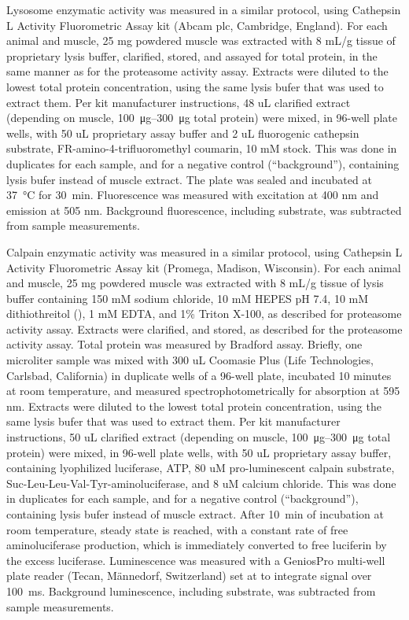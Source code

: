 \documentclass[12pt,english]{report}\usepackage[]{graphicx}\usepackage[]{color}
\begin{document}
Lysosome enzymatic activity was measured in a similar protocol, using
Cathepsin L Activity Fluorometric Assay kit (Abcam plc, Cambridge,
England). For each animal and muscle, 25 mg powdered muscle was extracted
with 8 mL/g tissue of proprietary lysis buffer, clarified, stored,
and assayed for total protein, in the same manner as for the proteasome
activity assay. Extracts were diluted to the lowest total protein
concentration, using the same lysis bufer that was used to extract
them. Per kit manufacturer instructions, 48 uL clarified extract (depending
on muscle, \SIrange{100}{300}{\micro\gram} total protein) were mixed,
in 96-well plate wells, with 50 uL proprietary assay buffer and 2
uL fluorogenic cathepsin substrate, FR-amino-4-trifluoromethyl coumarin,
10 mM stock. This was done in duplicates for each sample, and for
a negative control (``background''), containing lysis bufer instead
of muscle extract. The plate was sealed and incubated at \SI{37}{\celsius}
for \SI{30}{\minute}. Fluorescence was measured with excitation at
400 nm and emission at 505 nm. Background fluorescence, including
substrate, was subtracted from sample measurements.

Calpain enzymatic activity was measured in a similar protocol, using
Cathepsin L Activity Fluorometric Assay kit (Promega, Madison, Wisconsin).
For each animal and muscle, 25 mg powdered muscle was extracted with
8 mL/g tissue of lysis buffer containing 150 mM sodium chloride, 10
mM HEPES pH 7.4, 10 mM dithiothreitol (),
1 mM EDTA, and 1\% Triton X-100, as described for proteasome activity
assay. Extracts were clarified, and stored, as described for the proteasome
activity assay. Total protein was measured by Bradford assay. Briefly,
one microliter sample was mixed with 300 uL Coomasie Plus (Life Technologies,
Carlsbad, California) in duplicate wells of a 96-well plate, incubated
10 minutes at room temperature, and measured spectrophotometrically
for absorption at 595 nm. Extracts were diluted to the lowest total
protein concentration, using the same lysis bufer that was used to
extract them. Per kit manufacturer instructions, 50 uL clarified extract
(depending on muscle, \SIrange{100}{300}{\micro\gram} total protein)
were mixed, in 96-well plate wells, with 50 uL proprietary assay buffer,
containing lyophilized luciferase, ATP, 80 uM pro-luminescent calpain
substrate, Suc-Leu-Leu-Val-Tyr-aminoluciferase, and 8 uM calcium chloride.
This was done in duplicates for each sample, and for a negative control
(``background''), containing lysis bufer instead of muscle extract.
After \SI{10}{\minute} of incubation at room temperature, steady
state is reached, with a constant rate of free aminoluciferase production,
which is immediately converted to free luciferin by the excess luciferase.
Luminescence was measured with a GeniosPro multi-well plate reader
(Tecan, Männedorf, Switzerland) set at to integrate signal over \SI{100}{\milli\second}.
Background luminescence, including substrate, was subtracted from
sample measurements.
\end{document}
